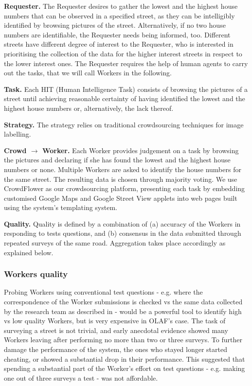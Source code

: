 \textbf{Requester.} The Requester desires to gather the lowest and the highest house numbers that can be observed in a specified street, as they can be intelligibly identified by browsing pictures of the street. Alternatively, if no two house numbers are identifiable, the Requester needs being informed, too. Different streets have different degree of interest to the Requester, who is interested in prioritising the collection of the data for the higher interest streets in respect to the lower interest ones. The Requester requires the help of human agents to carry out the tasks, that we will call Workers in the following.

\textbf{Task.} Each HIT (Human Intelligence Task) consists of browsing the pictures of a street until achieving reasonable certainty of having identified the lowest and the highest house numbers or, alternatively, the lack thereof.

\textbf{Strategy.} 
The strategy relies on traditional crowdsourcing techniques for image labelling.

\textbf{Crowd $\rightarrow$ Worker.} Each Worker provides judgement on a task by browsing the pictures and declaring if she has found the lowest and the highest house numbers or none. Multiple Workers are asked to identify the house numbers for the same street. The resulting data is chosen through majority voting. We use CrowdFlower as our crowdsourcing platform, presenting each task by embedding customised Google Maps and Google Street View applets into web pages built using the system's templating system. 

\textbf{Quality.} Quality is defined by a combination of (a) accuracy of the Workers in responding to tests questions, and (b) consensus in the data submitted through repeated surveys of the same road. Aggregation takes place accordingly as explained below.

\subsubsection{Workers quality}
    
Probing Workers using conventional test questions - e.g. where the correspondence of the Worker submissions is checked vs the same data collected by the research team as described in \cite{Kittur:2008gj} - would be a powerful tool to identify high vs low quality Workers, but is very expensive in OLAF's case. The task of surveying a street is not trivial, and early anecdotal evidence showed many Workers leaving after performing no more than two or three surveys. To further damage the performance of the system, the ones who stayed longer started cheating, or showed a substantial drop in their performance. This suggested that spending a substantial part of the Worker's effort on test questions - e.g. making one out of three surveys a test - was not affordable.

